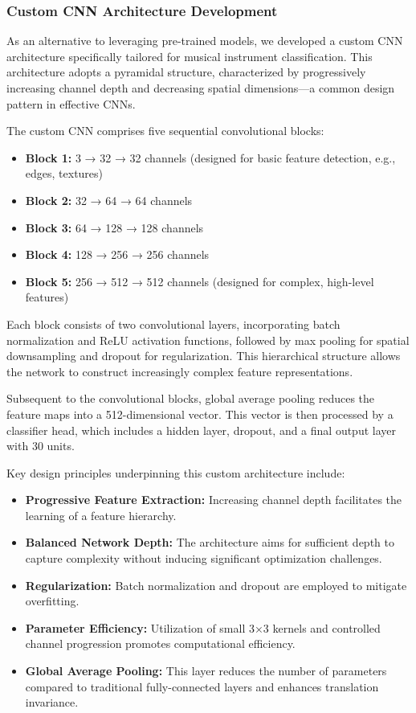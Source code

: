 \subsubsection{Custom CNN Architecture Development}
As an alternative to leveraging pre-trained models, we developed a custom CNN architecture specifically tailored for musical instrument classification. This architecture adopts a pyramidal structure, characterized by progressively increasing channel depth and decreasing spatial dimensions—a common design pattern in effective CNNs.

The custom CNN comprises five sequential convolutional blocks:
\begin{itemize}
    \item \textbf{Block 1:} 3 → 32 → 32 channels (designed for basic feature detection, e.g., edges, textures)
    \item \textbf{Block 2:} 32 → 64 → 64 channels
    \item \textbf{Block 3:} 64 → 128 → 128 channels
    \item \textbf{Block 4:} 128 → 256 → 256 channels
    \item \textbf{Block 5:} 256 → 512 → 512 channels (designed for complex, high-level features)
\end{itemize}
Each block consists of two convolutional layers, incorporating batch normalization and ReLU activation functions, followed by max pooling for spatial downsampling and dropout for regularization. This hierarchical structure allows the network to construct increasingly complex feature representations.

Subsequent to the convolutional blocks, global average pooling reduces the feature maps into a 512-dimensional vector. This vector is then processed by a classifier head, which includes a hidden layer, dropout, and a final output layer with 30 units.

Key design principles underpinning this custom architecture include:
\begin{itemize}
    \item \textbf{Progressive Feature Extraction:} Increasing channel depth facilitates the learning of a feature hierarchy.
    \item \textbf{Balanced Network Depth:} The architecture aims for sufficient depth to capture complexity without inducing significant optimization challenges.
    \item \textbf{Regularization:} Batch normalization and dropout are employed to mitigate overfitting.
    \item \textbf{Parameter Efficiency:} Utilization of small 3×3 kernels and controlled channel progression promotes computational efficiency.
    \item \textbf{Global Average Pooling:} This layer reduces the number of parameters compared to traditional fully-connected layers and enhances translation invariance.
\end{itemize}

